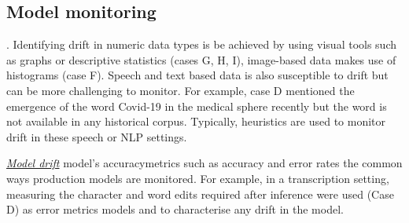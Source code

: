 \subsection{Model monitoring} 

\underline{\DIFdelbegin \emph{}%
\DIFdelend \DIFaddbegin \emph{}\DIFaddend } \DIFdelbegin {}\DIFdelend \DIFaddbegin {}\DIFaddend . Identifying drift in numeric data types is be achieved by using visual tools such as graphs or descriptive statistics (cases G, H, I), image-based data makes use of histograms (case F). Speech and text based data is also susceptible to drift but can be more challenging to monitor. For example, case D mentioned the emergence of the word Covid-19 in the medical sphere recently but the word is not available in any historical corpus. Typically, heuristics are used to monitor drift in these speech or NLP settings.

\underline{\emph{Model drift}} \DIFdelbegin {}\DIFdelend \DIFaddbegin {}\DIFaddend model's accuracy\DIFdelbegin {}\DIFdelend \DIFaddbegin {}\DIFaddend metrics such as accuracy and error rates \DIFdelbegin {}\DIFdelend \DIFaddbegin {}\DIFaddend the common ways production models are monitored. For example, in a transcription setting, measuring the character and word edits required after inference were used (Case D) as error metrics \DIFdelbegin {}\DIFdelend \DIFaddbegin {}\DIFaddend models and to characterise any drift in the model.

